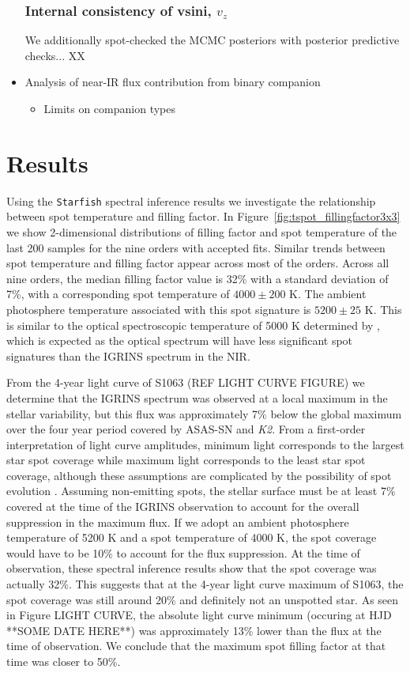 \documentclass[twocolumn]{emulateapj}%
\begin{document}
\begin{itemize}
\subsubsection{Internal consistency of vsini, $v_z$}
We additionally spot-checked the MCMC posteriors with posterior predictive checks... XX

\item Analysis of near-IR flux contribution from binary companion
\begin{itemize}
  \item Limits on companion types
\end{itemize}
\end{itemize}

\section{Results}

Using the \texttt{Starfish} spectral inference results we investigate the relationship between spot temperature and filling factor. In Figure~\ref{fig:tspot_fillingfactor3x3} we show 2-dimensional distributions of filling factor and spot temperature of the last 200 samples for the nine orders with accepted fits. Similar trends between spot temperature and filling factor appear across most of the orders. Across all nine orders, the median filling factor value is 32\% with a standard deviation of 7\%, with a corresponding spot temperature of $4000 \pm 200$ K. The ambient photosphere temperature associated with this spot signature is $5200\pm25$ K. This is similar to the optical spectroscopic temperature of 5000 K determined by \citet{mathieu03}, which is expected as the optical spectrum will have less significant spot signatures than the IGRINS spectrum in the NIR.

From the 4-year light curve of S1063 (REF LIGHT CURVE FIGURE) we determine that the IGRINS spectrum was observed at a local maximum in the stellar variability, but this flux was approximately 7\% below the global maximum over the four year period covered by ASAS-SN and \textit{K2}. From a first-order interpretation of light curve amplitudes, minimum light corresponds to the largest star spot coverage while maximum light corresponds to the least star spot coverage, although these assumptions are complicated by the possibility of spot evolution \citep{basri18}. Assuming non-emitting spots, the stellar surface must be at least 7\% covered at the time of the IGRINS observation to account for the overall suppression in the maximum flux. If we adopt an ambient photosphere temperature of 5200 K and a spot temperature of 4000 K, the spot coverage would have to be 10\% to account for the flux suppression. At the time of observation, these spectral inference results show that the spot coverage was actually 32\%. This suggests that at the 4-year light curve maximum of S1063, the spot coverage was still around 20\% and definitely not an unspotted star. As seen in Figure LIGHT CURVE, the absolute light curve minimum (occuring at HJD **SOME DATE HERE**) was approximately 13\% lower than the flux at the time of observation. We conclude that the maximum spot filling factor at that time was closer to 50\%.
\end{document}

